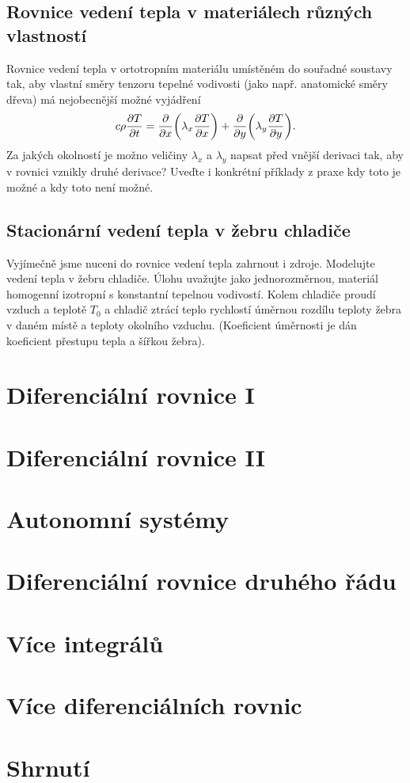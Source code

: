 \konec

\subsection{Rovnice vedení tepla v materiálech různých vlastností}

Rovnice vedení tepla v ortotropním materiálu umístěném do souřadné soustavy tak, aby vlastní směry tenzoru tepelné vodivosti (jako např. anatomické směry dřeva) má nejobecnější možné vyjádření
$$c\rho\pdv{T}{t}=\pdv{x}\qty(\lambda_x\pdv{T}{x} )+\pdv{y}\qty(\lambda_y\pdv{T}{y}) . $$
Za jakých okolností je možno veličiny $\lambda_x$ a $\lambda_y$ napsat před vnější derivaci tak, aby v rovnici vznikly druhé derivace? Uveďte i konkrétní příklady z praxe kdy toto je možné a kdy toto není možné.


\subsection{Stacionární vedení tepla v žebru chladiče}

Vyjímečně jsme nuceni do rovnice vedení tepla zahrnout i zdroje. 
Modelujte vedení tepla v žebru chladiče. Úlohu uvažujte jako
jednorozměrnou, materiál homogenní izotropní s konstantní tepelnou
vodivostí. Kolem chladiče proudí vzduch a teplotě $T_0$ a chladič
ztrácí teplo rychlostí úměrnou rozdílu teploty žebra v daném místě a
teploty okolního vzduchu. (Koeficient úměrnosti je dán koeficient přestupu tepla a šířkou žebra).


\section{Diferenciální rovnice I}

\section{Diferenciální rovnice II}

\section{Autonomní systémy}

\section{Diferenciální rovnice druhého řádu}

\section{Více integrálů}

\section{Více diferenciálních rovnic}

\section{Shrnutí}






